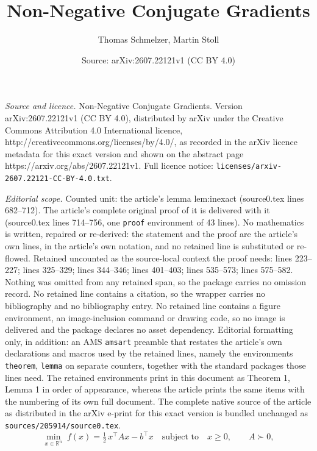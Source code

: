 \documentclass[10pt,a4paper]{amsart}
\title{Non-Negative Conjugate Gradients}
\author{Thomas Schmelzer, Martin Stoll}
\date{Source: arXiv:2607.22121v1 (CC BY 4.0)}
\begin{document}
\maketitle

\noindent\emph{Source and licence.} Non-Negative Conjugate Gradients. Version arXiv:2607.22121v1 (CC BY 4.0), distributed by arXiv under the Creative Commons Attribution 4.0 International licence, http://creativecommons.org/licenses/by/4.0/, as recorded in the arXiv licence metadata for this exact version and shown on the abstract page https://arxiv.org/abs/2607.22121v1. Full licence notice: \texttt{licenses/arxiv-2607.22121-CC-BY-4.0.txt}.\par\smallskip

\noindent\textit{Editorial scope.} Counted unit: the article's lemma lem:inexact (source0.tex lines 682--712). The article's complete original proof of it is delivered with it (source0.tex lines 714--756, one \texttt{proof} environment of 43 lines). No mathematics is written, repaired or re-derived: the statement and the proof are the article's own lines, in the article's own notation, and no retained line is substituted or re-flowed.  Retained uncounted as the source-local context the proof needs: lines 223--227; lines 325--329; lines 344--346; lines 401--403; lines 535--573; lines 575--582.  Nothing was omitted from any retained span, so the package carries no omission record.  No retained line contains a citation, so the wrapper carries no bibliography and no bibliography entry.  No retained line contains a figure environment, an image-inclusion command or drawing code, so no image is delivered and the package declares no asset dependency.  Editorial formatting only, in addition: an AMS \texttt{amsart} preamble that restates the article's own declarations and macros used by the retained lines, namely the environments \texttt{theorem}, \texttt{lemma} on separate counters, together with the standard packages those lines need.  The retained environments print in this document as Theorem 1, Lemma 1 in order of appearance, whereas the article prints the same items with the numbering of its own full document.  The complete native source of the article as distributed in the arXiv e-print for this exact version is bundled unchanged as \texttt{sources/205914/source0.tex}.
\begin{equation}\label{eq:bqp}
  \min_{x \in \mathbb{R}^n}\; f(x) = \tfrac{1}{2}\,x^\top A x - b^\top x
  \quad\text{subject to}\quad x \geq 0,
  \qquad A \succ 0,
\end{equation}
\end{document}
